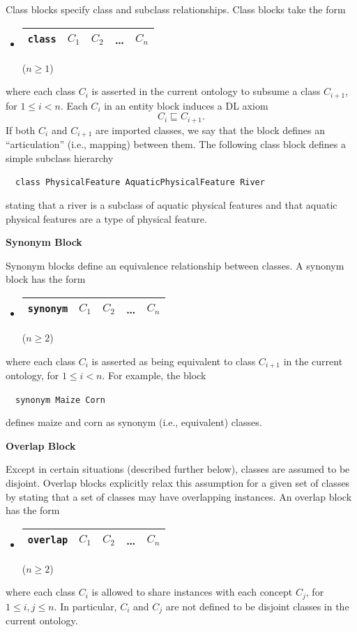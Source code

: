 \documentclass[preprint,number]{elsarticle}
\newcommand{\mypara}[1]{\vspace{12pt}\noindent\textbf{#1}}
\begin{document}
\mypara{}Class blocks specify class and subclass relationships. Class
blocks take the form
\begin{itemize}
\item[] 
  \begin{tabular}{|l|l|l|l|l|}\hline
    \texttt{class} & $C_1$ & $C_2$ & \dots & $C_n$ \\ \hline 
  \end{tabular} \hfill ($n \ge 1$)
\end{itemize}
where each class $C_i$ is asserted in the current ontology to subsume
a class $C_{i+1}$, for $1 \le i < n$. Each $C_i$ in an entity block
induces a DL axiom \[C_i \sqsubseteq C_{i+1}.\] If both $C_i$ and
$C_{i+1}$ are imported classes, we say that the block defines an
``articulation'' (i.e., mapping) between them. The following class
block defines a simple subclass hierarchy
\begin{tabbing}
~~\texttt{class PhysicalFeature AquaticPhysicalFeature River}
\end{tabbing}
stating that a river is a subclass of aquatic physical features and
that aquatic physical features are a type of physical feature.

\mypara{Synonym Block}

\mypara{}Synonym blocks define an equivalence relationship between
classes.  A synonym block has the form
\begin{itemize}
\item[] 
  \begin{tabular}{|l|l|l|l|l|}\hline
    \texttt{synonym} & $C_1$ & $C_2$ & \dots & $C_n$ \\ \hline 
  \end{tabular} \hfill ($n \ge 2$)
\end{itemize}
where each class $C_i$ is asserted as being equivalent to class
$C_{i+1}$ in the current ontology, for $1 \le i < n$. For example, the
block
\begin{tabbing}
~~\texttt{synonym Maize Corn}
\end{tabbing}
defines maize and corn as synonym (i.e., equivalent) classes.


\mypara{Overlap Block} 

\mypara{}Except in certain situations (described further below),
classes are assumed to be disjoint.  Overlap blocks explicitly relax
this assumption for a given set of classes by stating that a set of
classes may have overlapping instances. An overlap block has the form
\begin{itemize}
\item[] 
  \begin{tabular}{|l|l|l|l|l|}\hline
    \texttt{overlap} & $C_1$ & $C_2$ & \dots & $C_n$ \\ \hline 
  \end{tabular} \hfill ($n \ge 2$)
\end{itemize}
where each class $C_i$ is allowed to share instances with each concept
$C_j$, for $1 \le i,j \le n$. In particular, $C_i$ and $C_j$ are not
defined to be disjoint classes in the current ontology. 
\end{document}
